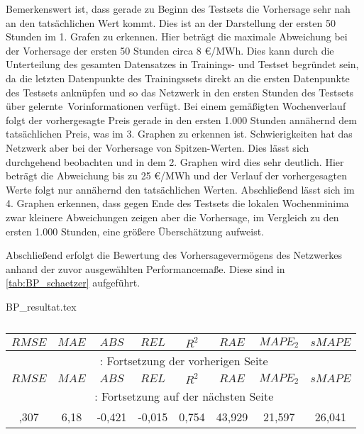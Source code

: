 Bemerkenswert ist, dass gerade zu Beginn des Testsets die Vorhersage sehr nah an den tatsächlichen Wert kommt. Dies ist an der Darstellung der ersten 50 Stunden im 1. Grafen zu erkennen. Hier beträgt die maximale Abweichung bei der Vorhersage der ersten 50 Stunden circa 8 €/MWh. Dies kann durch die Unterteilung des gesamten Datensatzes in Trainings- und Testset begründet sein, da die letzten Datenpunkte des Trainingssets direkt an die ersten Datenpunkte des Testsets anknüpfen und so das Netzwerk in den ersten Stunden des Testsets über \glqq gelernte\grqq~Vorinformationen verfügt.
Bei einem gemäßigten Wochenverlauf folgt der vorhergesagte Preis gerade in den ersten 1.000 Stunden annähernd dem tatsächlichen Preis, was im 3. Graphen zu erkennen ist. Schwierigkeiten hat das Netzwerk aber bei der Vorhersage von Spitzen-Werten. Dies lässt sich durchgehend beobachten und in dem 2. Graphen wird dies sehr deutlich. Hier beträgt die Abweichung bis zu 25 €/MWh und der Verlauf der vorhergesagten Werte folgt nur annähernd den tatsächlichen Werten. Abschließend lässt sich im 4. Graphen erkennen, dass gegen Ende des Testsets die lokalen Wochenminima zwar kleinere Abweichungen zeigen aber die Vorhersage, im Vergleich zu den ersten 1.000 Stunden, eine größere Überschätzung aufweist.

Abschließend erfolgt die Bewertung des Vorhersagevermögens des Netzwerkes anhand der zuvor ausgewählten Performancemaße. Diese sind in \autoref{tab:BP_schaetzer} aufgeführt.


\begin{filecontents*}{BP_resultat.tex}
{
\captionsetup{skip=1pt,margin=5pt,position=below} %

\begin{longtable}{cccccccc}
    \caption{} \label{tab:BP_schaetzer}\\
    \toprule
    \hiderowcolors
        $RMSE$ & $MAE$ & $ABS$ & $REL$ & $R^2$ & $RAE$ & $MAPE_2$ & $sMAPE$ \\
    \midrule
    \endfirsthead
        \multicolumn{8}{c}{\footnotesize \tablename\ \thetable{}: Fortsetzung der vorherigen Seite} \\
    \toprule
        $RMSE$ & $MAE$ & $ABS$ & $REL$ & $R^2$ & $RAE$ & $MAPE_2$ & $sMAPE$ \\
    \midrule
    \endhead
    \midrule
        \multicolumn{8}{c}{{\footnotesize \tablename\ \thetable{}: Fortsetzung auf der nächsten Seite}} \\
    \bottomrule
    \endfoot
    \bottomrule
    \endlastfoot
    \showrowcolors
        8,307 & 6,18 & -0,421 & -0,015 & 0,754 & 43,929 & 21,597 & 26,041 \\
\end{longtable}

}
\end{filecontents*}


